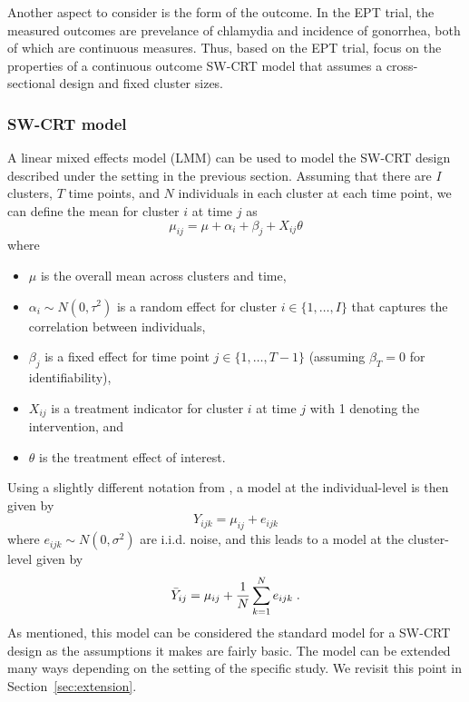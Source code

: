 \documentclass[10pt]{article}
\begin{document}
Another aspect to consider is the form of the outcome. In the EPT trial, the measured outcomes are prevelance of chlamydia and incidence of gonorrhea, both of which are continuous measures. Thus, based on the EPT trial, \citeauthor{Hussey:2007} focus on the properties of a continuous outcome SW-CRT model that assumes a cross-sectional design and fixed cluster sizes.

\subsubsection{SW-CRT model} \label{sec:model}

A linear mixed effects model (LMM) can be used to model the SW-CRT design described under the setting in the previous section. Assuming that there are $I$ clusters, $T$ time points, and $N$ individuals in each cluster at each time point, we can define the mean for cluster $i$ at time $j$ as
\[
\mu_{ij} = \mu + \alpha_i + \beta_j + X_{ij}\theta
\]
where
\begin{itemize}

\item
$\mu$ is the overall mean across clusters and time,

\item
$\alpha_i\sim N(0,\tau^2)$ is a random effect for cluster $i\in\{1,\ldots,I\}$ that captures the correlation between individuals,

\item
$\beta_j$ is a fixed effect for time point $j\in\{1,\ldots,T-1\}$ (assuming $\beta_T=0$ for identifiability),

\item
$X_{ij}$ is a treatment indicator for cluster $i$ at time $j$ with 1 denoting the intervention, and

\item
$\theta$ is the treatment effect of interest.

\end{itemize}
Using a slightly different notation from \citeauthor{Hussey:2007}, a model at the individual-level is then given by
\[
Y_{ijk} = \mu_{ij} + e_{ijk}
\]
where $e_{ijk}\sim N(0,\sigma^2)$ are i.i.d. noise, and this leads to a model at the cluster-level given by
\[
\bar{Y}_{ij} = \mu_{ij} + \frac{1}{N}\sum_{k=1}^Ne_{ijk} \;.
\]
As mentioned, this model can be considered the standard model for a SW-CRT design as the assumptions it makes are fairly basic. The model can be extended many ways depending on the setting of the specific study. We revisit this point in Section~\ref{sec:extension}.
\\
\end{document}
